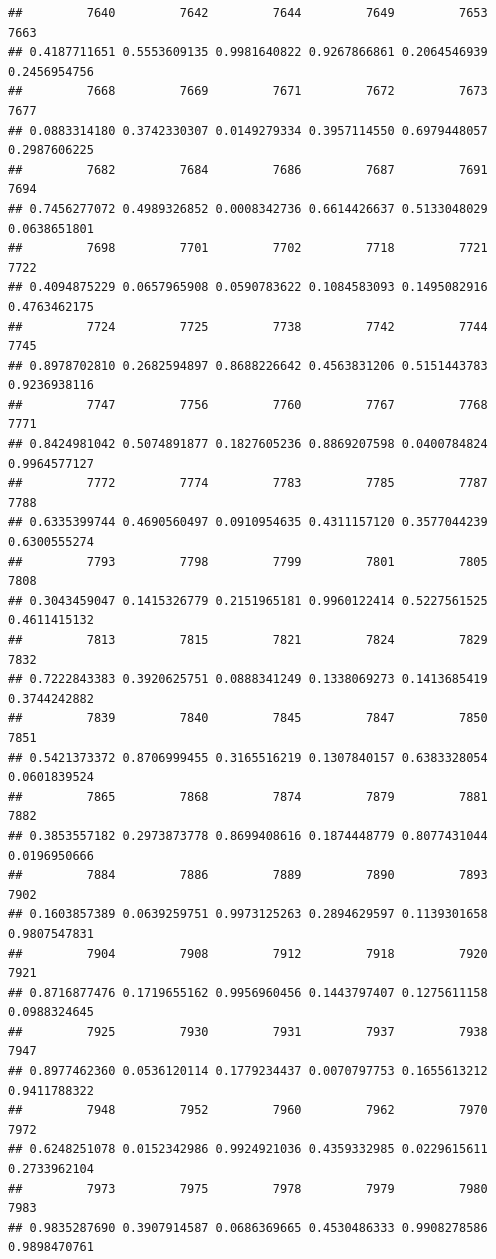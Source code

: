 \documentclass[
]{article}
\begin{document}
\begin{verbatim}
##         7640         7642         7644         7649         7653         7663 
## 0.4187711651 0.5553609135 0.9981640822 0.9267866861 0.2064546939 0.2456954756 
##         7668         7669         7671         7672         7673         7677 
## 0.0883314180 0.3742330307 0.0149279334 0.3957114550 0.6979448057 0.2987606225 
##         7682         7684         7686         7687         7691         7694 
## 0.7456277072 0.4989326852 0.0008342736 0.6614426637 0.5133048029 0.0638651801 
##         7698         7701         7702         7718         7721         7722 
## 0.4094875229 0.0657965908 0.0590783622 0.1084583093 0.1495082916 0.4763462175 
##         7724         7725         7738         7742         7744         7745 
## 0.8978702810 0.2682594897 0.8688226642 0.4563831206 0.5151443783 0.9236938116 
##         7747         7756         7760         7767         7768         7771 
## 0.8424981042 0.5074891877 0.1827605236 0.8869207598 0.0400784824 0.9964577127 
##         7772         7774         7783         7785         7787         7788 
## 0.6335399744 0.4690560497 0.0910954635 0.4311157120 0.3577044239 0.6300555274 
##         7793         7798         7799         7801         7805         7808 
## 0.3043459047 0.1415326779 0.2151965181 0.9960122414 0.5227561525 0.4611415132 
##         7813         7815         7821         7824         7829         7832 
## 0.7222843383 0.3920625751 0.0888341249 0.1338069273 0.1413685419 0.3744242882 
##         7839         7840         7845         7847         7850         7851 
## 0.5421373372 0.8706999455 0.3165516219 0.1307840157 0.6383328054 0.0601839524 
##         7865         7868         7874         7879         7881         7882 
## 0.3853557182 0.2973873778 0.8699408616 0.1874448779 0.8077431044 0.0196950666 
##         7884         7886         7889         7890         7893         7902 
## 0.1603857389 0.0639259751 0.9973125263 0.2894629597 0.1139301658 0.9807547831 
##         7904         7908         7912         7918         7920         7921 
## 0.8716877476 0.1719655162 0.9956960456 0.1443797407 0.1275611158 0.0988324645 
##         7925         7930         7931         7937         7938         7947 
## 0.8977462360 0.0536120114 0.1779234437 0.0070797753 0.1655613212 0.9411788322 
##         7948         7952         7960         7962         7970         7972 
## 0.6248251078 0.0152342986 0.9924921036 0.4359332985 0.0229615611 0.2733962104 
##         7973         7975         7978         7979         7980         7983 
## 0.9835287690 0.3907914587 0.0686369665 0.4530486333 0.9908278586 0.9898470761 

\end{verbatim}
\end{document}
